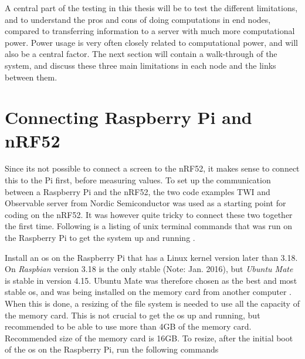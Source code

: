 

A central part of the testing in this thesis will be to test the different limitations, and to understand the pros and cons of doing computations in end nodes, compared to transferring information to a server with much more computational power. Power usage is very often closely related to computational power, and will also be a central factor. The next section will contain a walk-through of the system, and discuss these three main limitations in each node and the links between them.



\section{Connecting Raspberry Pi and nRF52}


Since its not possible to connect a screen to the \gls{nRF52}, it makes sense to connect this to the Pi first, before measuring values. To set up the communication between a \gls{Raspberry Pi} and the \gls{nRF52}, the two code examples TWI and Observable server from Nordic Semiconductor was used as a starting point for coding on the nRF52. It was however quite tricky to connect these two together the first time. Following is a listing of unix terminal commands that was run on the \gls{Raspberry Pi} to get the system up and running \cite{nordicNrfDocumentation}. 

Install an \gls{os} on the Raspberry Pi that has a Linux kernel version later than 3.18. On \textit{Raspbian} version 3.18 is the only stable (Note: Jan. 2016), but \textit{Ubuntu Mate} is stable in version 4.15. Ubuntu Mate was therefore chosen as the best and most stable \gls{os}, and was being installed on the memory card from another computer \cite{ubuntuMate}. When this is done, a resizing of the file system is needed to use all the capacity of the memory card. This is not crucial to get the \gls{os} up and running, but recommended to be able to use more than 4GB of the memory card. Recommended size of the memory card is 16GB. To resize, after the initial boot of the \gls{os} on the \gls{Raspberry Pi}, run the following commands

